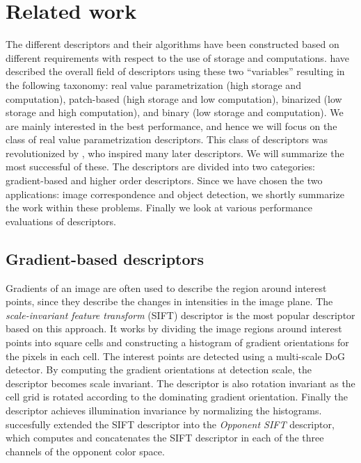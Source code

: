 \documentclass[thesis.tex]{subfiles}
\begin{document}
\chapter{Related work}
The different descriptors and their algorithms have been constructed based on different requirements with respect to the use of storage and computations. \citet{heinly2012comparative} have described the overall field of descriptors using these two ``variables'' resulting in the following taxonomy: real value parametrization (high storage and computation), patch-based (high storage and low computation), binarized (low storage and high computation), and binary (low storage and computation). We are mainly interested in the best performance, and hence we will focus on the class of real value parametrization descriptors. This class of descriptors was revolutionized by \citet{lowe2004distinctive}, who inspired many later descriptors. We will summarize the most successful of these. The descriptors are divided into two categories: gradient-based and higher order descriptors. Since we have chosen the two applications: image correspondence and object detection, we shortly summarize the work within these problems. Finally we look at various performance evaluations of descriptors.

\section{Gradient-based descriptors}
\label{sec:gradientDescriptors}
Gradients of an image are often used to describe the region around interest points, since they describe the changes in intensities in the image plane. The \emph{scale-invariant feature transform} (SIFT) descriptor \cite{lowe2004distinctive} is the most popular descriptor based on this approach. It works by dividing the image regions around interest points into square cells and constructing a histogram of gradient orientations for the pixels in each cell. The interest points are detected using a multi-scale DoG detector. By computing the gradient orientations at detection scale, the descriptor becomes scale invariant. The descriptor is also rotation invariant as the cell grid is rotated according to the dominating gradient orientation. Finally the descriptor achieves illumination invariance by normalizing the histograms. \citet{van2010evaluating} succesfully extended the SIFT descriptor into the \emph{Opponent SIFT} descriptor, which computes and concatenates the SIFT descriptor in each of the three channels of the opponent color space.
\end{document}

